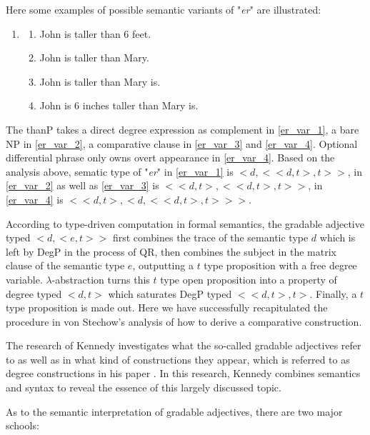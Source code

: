 \documentclass{ctexart}
\let \cite \parencite
\begin{document}
Here some examples of possible semantic variants of "\textit{er}" are illustrated:

\begin{enumerate}[resume]
    \item
    \begin{enumerate}[ref=(\arabic{enumi}\alph*)]
        \item \label{er_var_1} John is taller than 6 feet.
        \item \label{er_var_2} John is taller than Mary.
        \item \label{er_var_3} John is taller than Mary is.
        \item \label{er_var_4} John is 6 inches taller than Mary is.
    \end{enumerate}

\end{enumerate}

The thanP takes a direct degree expression as complement in \ref{er_var_1}, a bare NP in \ref{er_var_2}, a comparative clause in \ref{er_var_3} and \ref{er_var_4}. Optional differential phrase only owns overt appearance in \ref{er_var_4}. Based on the analysis above, sematic type of "\textit{er}" in \ref{er_var_1} is $<d,<<d,t>,t>>$, in \ref{er_var_2} as well as \ref{er_var_3} is $<<d,t>,<<d,t>,t>>$, in \ref{er_var_4} is $<<d,t>,<d,<<d,t>,t>>>$.

According to type-driven computation in formal semantics, the gradable adjective typed $<d,<e,t>>$ first combines the trace of the semantic type $d$ which is left by DegP in the process of QR, then combines the subject in the matrix clause of the semantic type $e$, outputting a $t$ type proposition with a free degree variable. $\lambda$-abstraction turns this $t$ type open proposition into a property of degree typed $<d,t>$ which saturates DegP typed $<<d,t>,t>$. Finally, a $t$ type proposition is made out. Here we have successfully recapitulated the procedure in von Stechow’s analysis of how to derive a comparative construction.

The research of Kennedy investigates what the so-called gradable adjectives refer to as well as in what kind of constructions they appear, which is referred to as degree constructions in his paper \cite{kennedy1997}. In this research, Kennedy combines semantics and syntax to reveal the essence of this largely discussed topic.

As to the semantic interpretation of gradable adjectives, there are two major schools:
\end{document}
